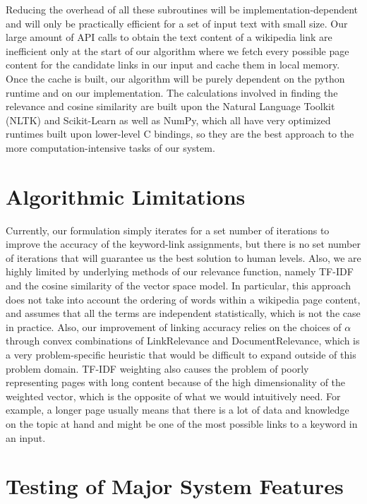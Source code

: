 \documentclass[twoside,11pt]{article}
\begin{document}
Reducing the overhead of all these subroutines will be implementation-dependent and will only be practically efficient for a set of input text with small size. Our large amount of API calls to obtain the text content of a wikipedia link are inefficient only at the start of our algorithm where we fetch every possible page content for the candidate links in our input and cache them in local memory. Once the cache is built, our algorithm will be purely dependent on the python runtime and on our implementation. The calculations involved in finding the relevance and cosine similarity are built upon the Natural Language Toolkit (NLTK) and Scikit-Learn as well as NumPy, which all have very optimized runtimes built upon lower-level C bindings, so they are the best approach to the more computation-intensive tasks of our system.

\section{Algorithmic Limitations}

Currently, our formulation simply iterates for a set number of iterations to improve the accuracy of the keyword-link assignments, but there is no set number of iterations that will guarantee us the best solution to human levels. Also, we are highly limited by underlying methods of our relevance function, namely TF-IDF and the cosine similarity of the vector space model. In particular, this approach does not take into account the ordering of words within a wikipedia page content, and assumes that all the terms are independent statistically, which is not the case in practice. Also, our improvement of linking accuracy relies on the choices of $\alpha$ through convex combinations of {\sc LinkRelevance} and {\sc DocumentRelevance}, which is a very problem-specific heuristic that would be difficult to expand outside of this problem domain. TF-IDF weighting also causes the problem of poorly representing pages with long content because of the high dimensionality of the weighted vector, which is the opposite of what we would intuitively need. For example, a longer page usually means that there is a lot of data and knowledge on the topic at hand and might be one of the most possible links to a keyword in an input.

\section{Testing of Major System Features}
\end{document}
